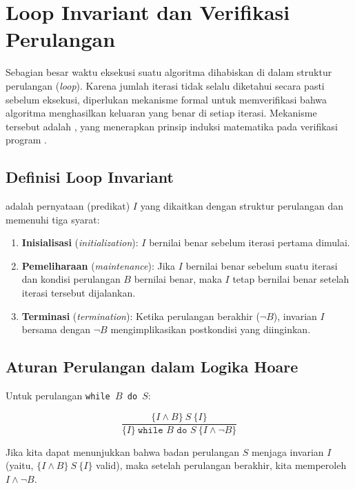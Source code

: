 \section{Loop Invariant dan Verifikasi Perulangan}

Sebagian besar waktu eksekusi suatu algoritma dihabiskan di dalam struktur perulangan (\textit{loop}). Karena jumlah iterasi tidak selalu diketahui secara pasti sebelum eksekusi, diperlukan mekanisme formal untuk memverifikasi bahwa algoritma menghasilkan keluaran yang benar di setiap iterasi. Mekanisme tersebut adalah , yang menerapkan prinsip induksi matematika pada verifikasi program \cite{rosen2019}.

\subsection{Definisi Loop Invariant}

\begin{definisi}
 adalah pernyataan (predikat) $I$ yang dikaitkan dengan struktur perulangan dan memenuhi tiga syarat:
\begin{enumerate}
    \item \textbf{Inisialisasi} (\textit{initialization}): $I$ bernilai benar sebelum iterasi pertama dimulai.
    \item \textbf{Pemeliharaan} (\textit{maintenance}): Jika $I$ bernilai benar sebelum suatu iterasi dan kondisi perulangan $B$ bernilai benar, maka $I$ tetap bernilai benar setelah iterasi tersebut dijalankan.
    \item \textbf{Terminasi} (\textit{termination}): Ketika perulangan berakhir ($\neg B$), invarian $I$ bersama dengan $\neg B$ mengimplikasikan postkondisi yang diinginkan.
\end{enumerate}
\end{definisi}

\subsection{Aturan Perulangan dalam Logika Hoare}

Untuk perulangan \texttt{while $B$ do $S$}:

\[ \frac{\{I \wedge B\}\ S\ \{I\}}{\{I\}\ \texttt{while } B \texttt{ do } S\ \{I \wedge \neg B\}} \]

Jika kita dapat menunjukkan bahwa badan perulangan $S$ menjaga invarian $I$ (yaitu, $\{I \wedge B\}\ S\ \{I\}$ valid), maka setelah perulangan berakhir, kita memperoleh $I \wedge \neg B$.

